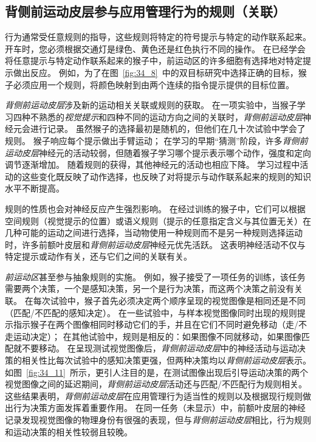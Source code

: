 \subsection{背侧前运动皮层参与应用管理行为的规则（关联）}

行为通常受任意规则的指导，这些规则将特定的符号提示与特定的动作联系起来。
开车时，您必须根据交通灯是绿色、黄色还是红色执行不同的操作。
在已经学会将任意提示与特定动作联系起来的猴子中，前运动区的许多细胞有选择地对特定提示做出反应。
例如，为了在图~\ref{fig:34_8}~中的双目标研究中选择正确的目标，猴子必须应用一个规则，将颜色映射到由两个连续的指令提示提供的目标位置。


\textit{背侧前运动皮层}涉及新的运动相关关联或规则的获取。
在一项实验中，当猴子学习四种不熟悉的\textit{视觉提示}和四种不同的运动方向之间的关联时，\textit{背侧前运动皮层}神经元会进行记录。
虽然猴子的选择最初是随机的，但他们在几十次试验中学会了规则。
猴子响应每个提示做出手臂运动；
在学习的早期“猜测”阶段，许多\textit{背侧前运动皮层}神经元的活动较弱，但随着猴子学习哪个提示表示哪个动作，强度和定向调节逐渐增加。
随着规则的获得，其他神经元的活动也相应下降。
学习过程中活动的这些变化既反映了动作选择，也反映了对将提示与动作联系起来的规则的知识水平不断提高。


规则的性质也会对神经反应产生强烈影响。
在经过训练的猴子中，它们可以根据空间规则（视觉提示的位置）或语义规则（提示的任意指定含义与其位置无关）在几种可能的运动之间进行选择，当动物使用一种规则而不是另一种规则选择运动时，许多前额叶皮层和\textit{背侧前运动皮层}神经元优先活跃。
这表明神经活动不仅与特定提示或动作有关，还与它们之间的关联有关。


\textit{前运动区}甚至参与抽象规则的实施。
例如，猴子接受了一项任务的训练，该任务需要两个决策，一个是感知决策，另一个是行为决策，而这两个决策之前没有关联。
在每次试验中，猴子首先必须决定两个顺序呈现的视觉图像是相同还是不同（匹配/不匹配的感知决定）。
在一些试验中，与样本视觉图像同时出现的规则提示指示猴子在两个图像相同时移动它们的手，并且在它们不同时避免移动（走/不走运动决定）；
在其他试验中，规则是相反的：如果图像不同就移动，如果图像匹配就不要移动。
在呈现测试视觉图像后，\textit{背侧前运动皮层}中的神经活动与运动决策的相关性比每次试验中的感知决策更强，但两种决策均以\textit{背侧前运动皮层}表示。
如图~\ref{fig:34_11}~所示，更引人注目的是，在测试图像出现后引导运动决策的两个视觉图像之间的延迟期间，\textit{背侧前运动皮层}活动还与匹配/不匹配行为规则相关。
这些结果表明，\textit{背侧前运动皮层}在应用管理行为适当性的规则以及根据现行规则做出行为决策方面发挥着重要作用。
在同一任务（未显示）中，前额叶皮层的神经记录发现视觉图像的物理身份有很强的表现，但与\textit{背侧前运动皮层}相比，行为规则和运动决策的相关性较弱且较晚。


